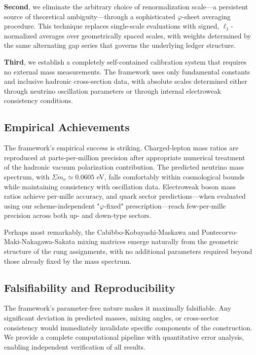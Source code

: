 \documentclass[%
amsmath,amssymb,
aps,
prb,
floatfix,
twocolumn
]{revtex4-2}
\begin{document}
\textbf{Second}, we eliminate the arbitrary choice of renormalization scale—a persistent source of theoretical ambiguity—through a sophisticated $\varphi$-sheet averaging procedure. This technique replaces single-scale evaluations with signed, $\ell_1$-normalized averages over geometrically spaced scales, with weights determined by the same alternating gap series that governs the underlying ledger structure.

\textbf{Third}, we establish a completely self-contained calibration system that requires no external mass measurements. The framework uses only fundamental constants and inclusive hadronic cross-section data, with absolute scales determined either through neutrino oscillation parameters or through internal electroweak consistency conditions.

\subsection{Empirical Achievements}

The framework's empirical success is striking. Charged-lepton mass ratios are reproduced at parts-per-million precision after appropriate numerical treatment of the hadronic vacuum polarization contribution. The predicted neutrino mass spectrum, with $\Sigma m_\nu \simeq 0.0605$ eV, falls comfortably within cosmological bounds while maintaining consistency with oscillation data. Electroweak boson mass ratios achieve per-mille accuracy, and quark sector predictions—when evaluated using our scheme-independent "$\varphi$-fixed" prescription—reach few-per-mille precision across both up- and down-type sectors.

Perhaps most remarkably, the Cabibbo-Kobayashi-Maskawa and Pontecorvo-Maki-Nakagawa-Sakata mixing matrices emerge naturally from the geometric structure of the rung assignments, with no additional parameters required beyond those already fixed by the mass spectrum.

\subsection{Falsifiability and Reproducibility}

The framework's parameter-free nature makes it maximally falsifiable. Any significant deviation in predicted masses, mixing angles, or cross-sector consistency would immediately invalidate specific components of the construction. We provide a complete computational pipeline with quantitative error analysis, enabling independent verification of all results.
\end{document}
